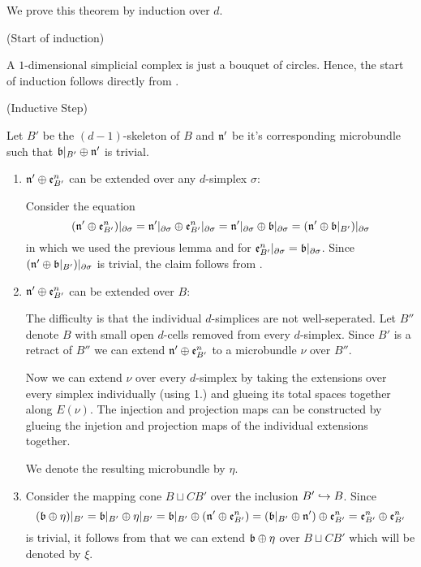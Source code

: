 \begin{myproof}
    We prove this theorem by induction over $d$.

    (Start of induction)

    A $1$-dimensional simplicial complex is just a bouquet of circles.
    Hence, the start of induction follows directly from .   

    (Inductive Step)

    Let $B'$ be the $(d - 1)$-skeleton of $B$ and $\mathfrak{n}'$ be it's corresponding microbundle
    such that $\mathfrak{b}\vert_{B'} \oplus{} \mathfrak{n}'$ is trivial.

    \begin{enumerate}
        \item $\mathfrak{n}' \oplus{} \mathfrak{e}^{n}_{B'}$ can be extended over any $d$-simplex $\sigma$:

        Consider the equation
        \[
            (\mathfrak{n}' \oplus{} \mathfrak{e}^{n}_{B'})\vert_{\partial\sigma}
            = \mathfrak{n}'\vert_{\partial\sigma} \oplus{} \mathfrak{e}^{n}_{B'}\vert_{\partial\sigma}
            = \mathfrak{n}'\vert_{\partial\sigma} \oplus{} \mathfrak{b}\vert_{\partial\sigma}
            = (\mathfrak{n}' \oplus{} \mathfrak{b}\vert_{B'})\vert_{\partial\sigma}
        \]
        in which we used the previous lemma and 
        for $\mathfrak{e}^{n}_{B'}\vert_{\partial\sigma} = \mathfrak{b}\vert_{\partial\sigma}$.
        Since $(\mathfrak{n}' \oplus{} \mathfrak{b}\vert_{B'})\vert_{\partial\sigma}$ is trivial, the claim follows from .

        \item $\mathfrak{n}' \oplus{} \mathfrak{e}^{n}_{B'}$ can be extended over $B$:

        The difficulty is that the individual $d$-simplices are not well-seperated.
        Let $B''$ denote $B$ with small open $d$-cells removed from every $d$-simplex.
        Since $B'$ is a retract of $B''$ we can extend $\mathfrak{n}' \oplus{} \mathfrak{e}^{n}_{B'}$ to a microbundle $\nu$ over $B''$.

        Now we can extend $\nu$ over every $d$-simplex by taking the extensions
        over every simplex individually (using 1.) and glueing its total spaces together along $E(\nu)$.
        The injection and projection maps can be constructed
        by glueing the injetion and projection maps of the individual extensions together.

        We denote the resulting microbundle by $\eta$.

        \item
        Consider the mapping cone $B \sqcup CB'$ over the inclusion $B' \hookrightarrow{} B$.
        Since
        \[
            (\mathfrak{b} \oplus{} \eta)\vert_{B'}
            = \mathfrak{b}\vert_{B'} \oplus{} \eta\vert_{B'}
            = \mathfrak{b}\vert_{B'} \oplus{} (\mathfrak{n}' \oplus{} \mathfrak{e}^{n}_{B'})
            = (\mathfrak{b}\vert_{B'} \oplus{} \mathfrak{n}') \oplus{} \mathfrak{e}^{n}_{B'}
            = \mathfrak{e}^{n}_{B'} \oplus{} \mathfrak{e}^{n}_{B'}
        \]
        is trivial, it follows from  that we can extend $\mathfrak{b} \oplus{} \eta$ over $B \sqcup CB'$
        which will be denoted by $\xi$.


\end{enumerate}
\end{myproof}
